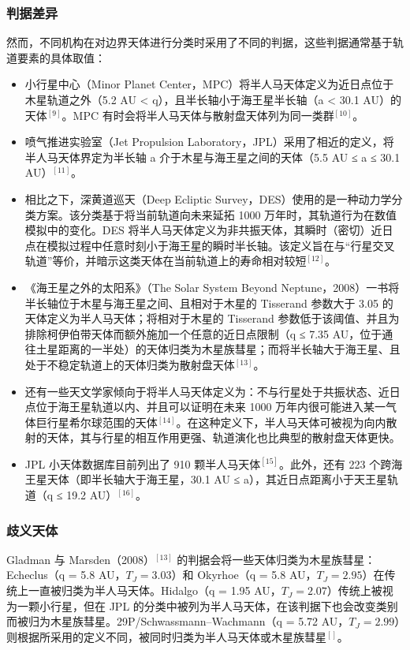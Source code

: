\subsubsection{判据差异}
然而，不同机构在对边界天体进行分类时采用了不同的判据，这些判据通常基于轨道要素的具体取值：
\begin{itemize}
\item 小行星中心（Minor Planet Center，MPC）将半人马天体定义为近日点位于木星轨道之外（5.2 AU < q），且半长轴小于海王星半长轴（a < 30.1 AU）的天体$^{[9]}$。MPC 有时会将半人马天体与散射盘天体列为同一类群$^{[10]}$。
\item 喷气推进实验室（Jet Propulsion Laboratory，JPL）采用了相近的定义，将半人马天体界定为半长轴 a 介于木星与海王星之间的天体（5.5 AU ≤ a ≤ 30.1 AU）$^{[11]}$。
\item 相比之下，深黄道巡天（Deep Ecliptic Survey，DES）使用的是一种动力学分类方案。该分类基于将当前轨道向未来延拓 1000 万年时，其轨道行为在数值模拟中的变化。DES 将半人马天体定义为非共振天体，其瞬时（密切）近日点在模拟过程中任意时刻小于海王星的瞬时半长轴。该定义旨在与“行星交叉轨道”等价，并暗示这类天体在当前轨道上的寿命相对较短$^{[12]}$。
\item 《海王星之外的太阳系》（The Solar System Beyond Neptune，2008）一书将半长轴位于木星与海王星之间、且相对于木星的 Tisserand 参数大于 3.05 的天体定义为半人马天体；将相对于木星的 Tisserand 参数低于该阈值、并且为排除柯伊伯带天体而额外施加一个任意的近日点限制（q ≤ 7.35 AU，位于通往土星距离的一半处）的天体归类为木星族彗星；而将半长轴大于海王星、且处于不稳定轨道上的天体归类为散射盘天体$^{[13]}$。
\item 还有一些天文学家倾向于将半人马天体定义为：不与行星处于共振状态、近日点位于海王星轨道以内、并且可以证明在未来 1000 万年内很可能进入某一气体巨行星希尔球范围的天体$^{[14]}$。在这种定义下，半人马天体可被视为向内散射的天体，其与行星的相互作用更强、轨道演化也比典型的散射盘天体更快。
\item JPL 小天体数据库目前列出了 910 颗半人马天体$^{[15]}$。此外，还有 223 个跨海王星天体（即半长轴大于海王星，30.1 AU ≤ a），其近日点距离小于天王星轨道（q ≤ 19.2 AU）$^{[16]}$。
\end{itemize}
\subsubsection{歧义天体}
Gladman 与 Marsden（2008）$^{[13]}$ 的判据会将一些天体归类为木星族彗星：Echeclus（q = 5.8 AU，$T_J = 3.03$）和 Okyrhoe（q = 5.8 AU，$T_J = 2.95$）在传统上一直被归类为半人马天体。Hidalgo（q = 1.95 AU，$T_J = 2.07$）传统上被视为一颗小行星，但在 JPL 的分类中被列为半人马天体，在该判据下也会改变类别而被归为木星族彗星。29P/Schwassmann–Wachmann（q = 5.72 AU，$T_J = 2.99$）则根据所采用的定义不同，被同时归类为半人马天体或木星族彗星$^{[]}$。

